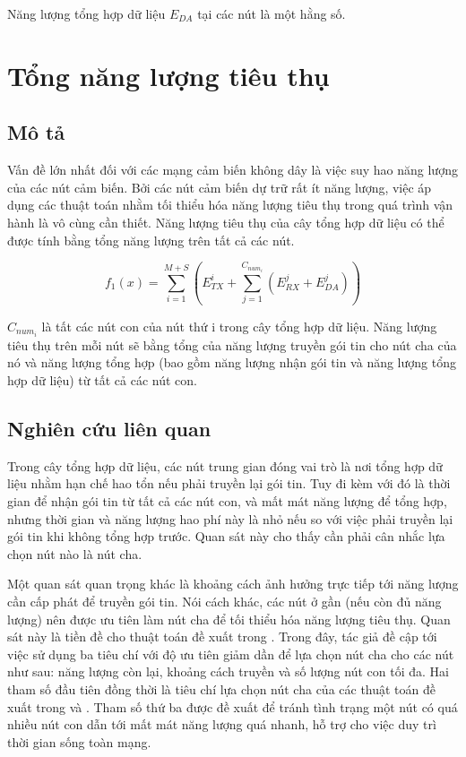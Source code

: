 Năng lượng tổng hợp dữ liệu $E_{DA}$ tại các nút là một hằng số.

\section{Tổng năng lượng tiêu thụ}
\subsection{Mô tả}
Vấn đề lớn nhất đối với các mạng cảm biến không dây là việc suy hao năng lượng của các nút cảm biến. Bởi các nút cảm biến dự trữ rất ít năng lượng, việc áp dụng các thuật toán nhằm tối thiểu hóa năng lượng tiêu thụ trong quá trình vận hành là vô cùng cần thiết. Năng lượng tiêu thụ của cây tổng hợp dữ liệu có thể được tính bằng tổng năng lượng trên tất cả các nút.

\begin{equation}
f_1(x) = \sum_{i=1}^{M + S} (E^i_{TX} + \sum_{j=1}^{C_{num_i}} (E_{RX}^j + E_{DA}^j))
\end{equation}

$C_{num_i}$ là tất các nút con của nút thứ i trong cây tổng hợp dữ liệu. Năng lượng tiêu thụ trên mỗi nút sẽ bằng tổng của năng lượng truyền gói tin cho nút cha của nó và năng lượng tổng hợp (bao gồm năng lượng nhận gói tin và năng lượng tổng hợp dữ liệu) từ tất cả các nút con.
\subsection{Nghiên cứu liên quan}
Trong cây tổng hợp dữ liệu, các nút trung gian đóng vai trò là nơi tổng hợp dữ liệu nhằm hạn chế hao tổn nếu phải truyền lại gói tin. Tuy đi kèm với đó là thời gian để nhận gói tin từ tất cả các nút con, và mất mát năng lượng để tổng hợp, nhưng thời gian và năng lượng hao phí này là nhỏ nếu so với việc phải truyền lại gói tin khi không tổng hợp trước. Quan sát này cho thấy cần phải cân nhắc lựa chọn nút nào là nút cha.


Một quan sát quan trọng khác là khoảng cách ảnh hưởng trực tiếp tới năng lượng cần cấp phát để truyền gói tin. Nói cách khác, các nút ở gần (nếu còn đủ năng lượng) nên được ưu tiên làm nút cha để tối thiểu hóa năng lượng tiêu thụ. Quan sát này là tiền đề cho thuật toán đề xuất trong \cite{eskandari2008energy}. Trong đây, tác giả đề cập tới việc sử dụng ba tiêu chí với độ ưu tiên giảm dần để lựa chọn nút cha cho các nút như sau: năng lượng còn lại, khoảng cách truyền và số lượng nút con tối đa. Hai tham số đầu tiên đồng thời là tiêu chí lựa chọn nút cha của các thuật toán đề xuất trong \cite{lee2005energy} và \cite{lee2005lpt}. Tham số thứ ba được đề xuất để tránh tình trạng một nút có quá nhiều nút con dẫn tới mất mát năng lượng quá nhanh, hỗ trợ cho việc duy trì thời gian sống toàn mạng.